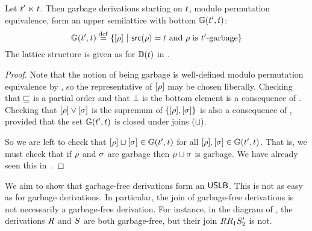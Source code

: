 \begin{proposition}
Let $t' \mathrel{\ltimes} t$.
Then garbage derivations starting on $t$, modulo permutation equivalence,
form an upper semilattice with bottom $\mathbb{G}(t', t)$:
\[
  \mathbb{G}(t', t) \overset{\mathrm{def}}{=} \{{[\rho]} \ |\  \mathsf{src}(\rho) = t \text{ and } \rho \text{ is $t'$-garbage}\}
\]
The lattice structure is given as for $\mathbb{D}(t)$ in .
\end{proposition}
\begin{proof}
Note that the notion of being garbage is well-defined modulo permutation equivalence
by ,
so the representative of ${[\rho]}$ may be chosen liberally.
Checking that $\sqsubseteq$ is a partial order and that $\bot$ is the bottom element is
a consequence of .
Checking that ${[\rho]} \lor {[\sigma]}$ is the supremum of $\{{[\rho]},{[\sigma]}\}$
is also a consequence of ,
provided that the set $\mathbb{G}(t', t)$ is closed under joins ($\sqcup$).

So we are left to check that ${[\rho]} \sqcup {[\sigma]} \in \mathbb{G}(t', t)$
for all ${[\rho]},{[\sigma]} \in \mathbb{G}(t', t)$.
That is,
we must check that if $\rho$ and $\sigma$ are garbage
then $\rho \sqcup \sigma$ is garbage.
We have already seen this in~.
\end{proof}

We aim to show that garbage-free derivations form an $\mathsf{USLB}$.
This is not as easy as for garbage derivations.
In particular, the join of garbage-free derivations is not necessarily a
garbage-free derivation.
For instance, in the diagram of ,
the derivations $R$ and $S$ are both garbage-free,
but their join $RR_1S'_2$ is not.


